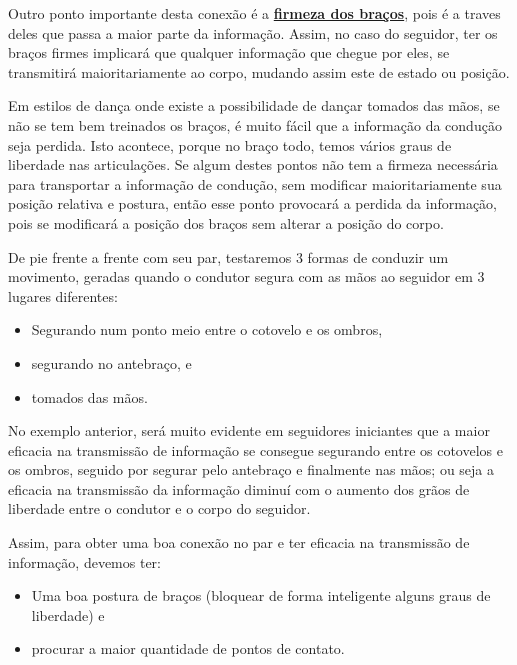 \begin{description}
Outro ponto importante desta conexão é a \hyperref[def:brazosfirmes]{\textbf{firmeza dos braços}}, 
pois é a traves deles que passa a maior parte da informação.
Assim, no caso do seguidor, ter os braços firmes implicará que qualquer informação que chegue por eles,
se transmitirá maioritariamente ao corpo,
mudando assim este de estado ou posição.

Em estilos de dança onde existe a possibilidade de dançar tomados das mãos,
se não se tem bem treinados os braços,
é muito fácil que a informação da condução seja perdida.
Isto acontece, porque no braço todo, temos vários graus de liberdade nas articulações.
Se algum destes pontos não tem a firmeza necessária para transportar a informação de condução, 
sem modificar maioritariamente sua posição relativa e postura,  
então esse ponto provocará a perdida da informação, 
pois se modificará a posição dos braços sem alterar a posição do corpo.
\begin{example}
De pie frente a frente com seu par, testaremos 3 formas de conduzir um movimento, 
geradas quando o condutor segura com as mãos ao seguidor em 3 lugares diferentes:
\begin{itemize}
\item Segurando num ponto meio entre o cotovelo e os ombros,
\item segurando no antebraço, e
\item tomados das mãos.
\end{itemize}
\end{example}
No exemplo anterior, será muito evidente em seguidores iniciantes
que a maior eficacia na transmissão de informação se consegue segurando entre os cotovelos e os ombros,
seguido por segurar pelo antebraço e finalmente nas mãos;
ou seja a eficacia na transmissão da informação 
diminuí com o aumento dos grãos de liberdade entre o condutor e o corpo do seguidor.

Assim, para obter uma boa conexão no par 
e ter eficacia na transmissão de informação, devemos ter:
\begin{itemize}
\item Uma boa postura de braços (bloquear de forma inteligente alguns graus de liberdade) e
\item procurar a maior quantidade de pontos de contato.
\end{itemize}  

\end{description}
